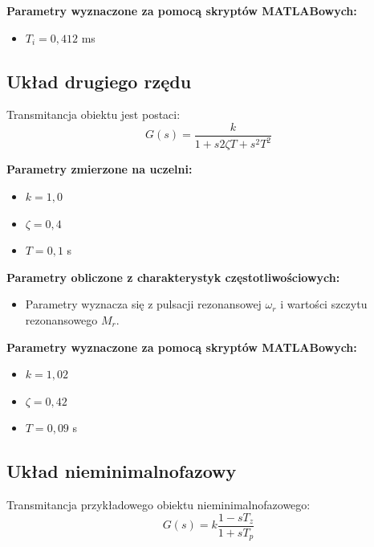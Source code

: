 \documentclass[12pt,a4paper]{article}
\begin{document}
	\noindent \textbf{Parametry wyznaczone za pomocą skryptów MATLABowych:}
	\begin{itemize}
		\item $T_i = 0{,}412$ ms %
	\end{itemize}
	
	\subsection{Układ drugiego rzędu}
	Transmitancja obiektu jest postaci:
	\begin{equation}
		G(s) = \frac{k}{1+s 2\zeta T + s^2 T^2}
	\end{equation}
	
	\noindent \textbf{Parametry zmierzone na uczelni:}
	\begin{itemize}
		\item $k = 1{,}0$ %
		\item $\zeta = 0{,}4$ %
		\item $T = 0{,}1$ s %
	\end{itemize}
	
	\noindent \textbf{Parametry obliczone z charakterystyk częstotliwościowych:}
	\begin{itemize}
		\item Parametry wyznacza się z pulsacji rezonansowej $\omega_r$ i wartości szczytu rezonansowego $M_r$.
	\end{itemize}
	
	\noindent \textbf{Parametry wyznaczone za pomocą skryptów MATLABowych:}
	\begin{itemize}
		\item $k = 1{,}02$ %
		\item $\zeta = 0{,}42$ %
		\item $T = 0{,}09$ s %
	\end{itemize}
	
	\subsection{Układ nieminimalnofazowy}
	Transmitancja przykładowego obiektu nieminimalnofazowego:
	\begin{equation}
		G(s) = k \frac{1-sT_z}{1+sT_p}
	\end{equation}
	
\end{document}
